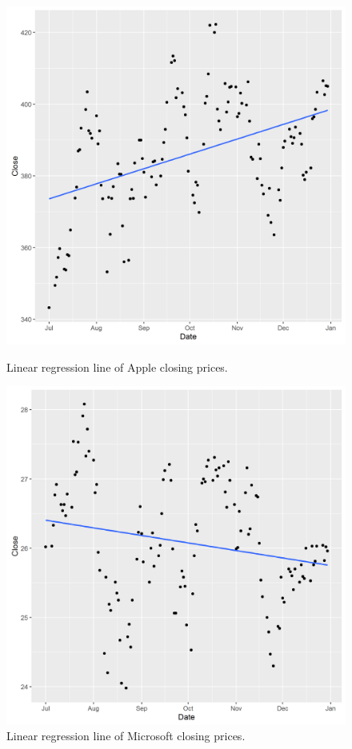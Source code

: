 \documentclass[paper=a4, fontsize=11pt]{scrartcl} %
\numberwithin{equation}{section} %
\numberwithin{figure}{section} %
\numberwithin{table}{section} %
\begin{document}
\begin{figure}[!htb]
  \includegraphics[width=\linewidth]{graph/a_reg2.png}
  \caption{Linear regression line of Apple closing prices.}
\endminipage\hfill
{}
  \includegraphics[width=\linewidth]{graph/m_reg2.png}
  \caption{Linear regression line of Microsoft closing prices.}
\endminipage\hfill
\end{figure}
\end{document}
